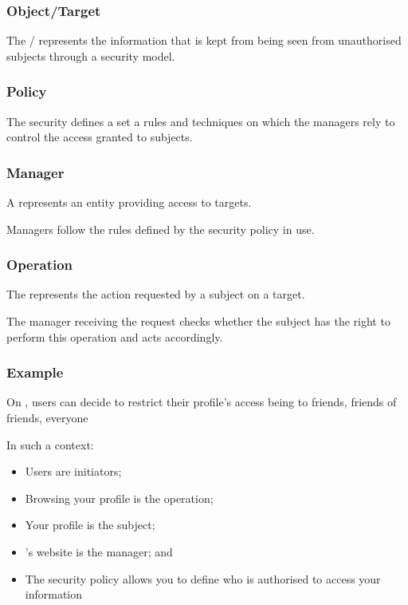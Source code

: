 
\begin{frame}
  \frametitle{Object/Target}

  The / represents the information that is kept
  from being seen from unauthorised subjects through a security model.
\end{frame}


\begin{frame}
  \frametitle{Policy}

  The security  defines a set a rules and techniques on which the
  managers rely to control the access granted to subjects.
\end{frame}


\begin{frame}
  \frametitle{Manager}

  A  represents an entity providing access to targets.

  \-

  Managers follow the rules defined by the security policy in use.
\end{frame}


\begin{frame}
  \frametitle{Operation}

  The  represents the action requested by a subject on
  a target.

  \-

  The manager receiving the request checks whether the subject has the right
  to perform this operation and acts accordingly.
\end{frame}


\begin{frame}
  \frametitle{Example}

  On , users can decide to restrict their profile's access
  being to friends, friends of friends, everyone \etc{}

  \-

  In such a context:

  \begin{itemize}
    \item
      Users are initiators;
    \item
      Browsing your profile is the operation;
    \item
      Your profile is the subject;
    \item
      's website is the manager; and
    \item
      The security policy allows you to define who is authorised to access
      your information
  \end{itemize}
\end{frame}

